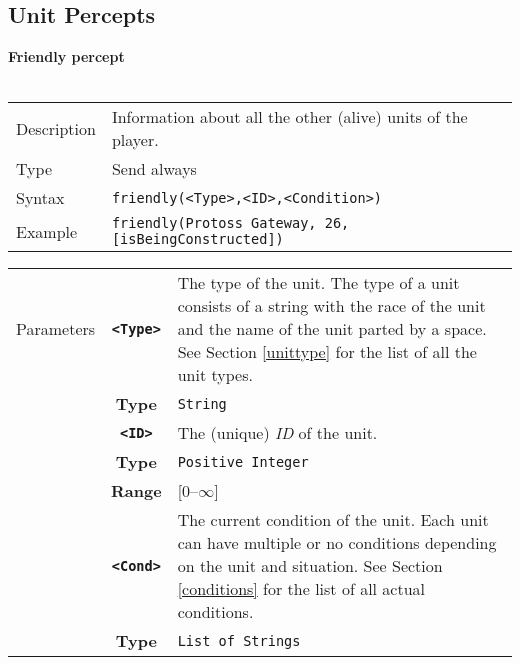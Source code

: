 \subsection{Unit Percepts}
\noindent
\textbf{Friendly percept}\\
\\
\begin{tabularx}{\textwidth}{lX}
 Description & Information about all the other (alive) units of the player. \\
 Type & Send always \\
 Syntax & \verb|friendly(<Type>,<ID>,<Condition>)| \\
 Example & \verb|friendly(Protoss Gateway, 26, [isBeingConstructed])| \\
 \end{tabularx}
 \begin{tabularx}{\textwidth}{l | c | p{8cm}|}
 \cline{2-3}
 Parameters
            & \textbf{\verb|<Type>|} & The type of the unit. The type of a unit consists of a string with the race of the unit and the name of the unit parted by a space. See Section \ref{unittype} for the list of all the unit types. \\
            & \textbf{Type} & \verb|String| \\
            \cline{2-3}
            & \textbf{\verb|<ID>|} & The (unique) \textit{ID} of the unit.\\
            & \textbf{Type} & \verb|Positive Integer| \\
            & \textbf{Range} & [0--$\infty$] \\
            \cline{2-3}
            & \textbf{\verb|<Cond>|} & The current condition of the unit. Each unit can have multiple or no conditions depending on the unit and situation. See Section \ref{conditions} for the list of all actual conditions.\\
            & \textbf{Type} & \verb|List of Strings| \\
            \cline{2-3}
\end{tabularx}\\
\newpage
\noindent

